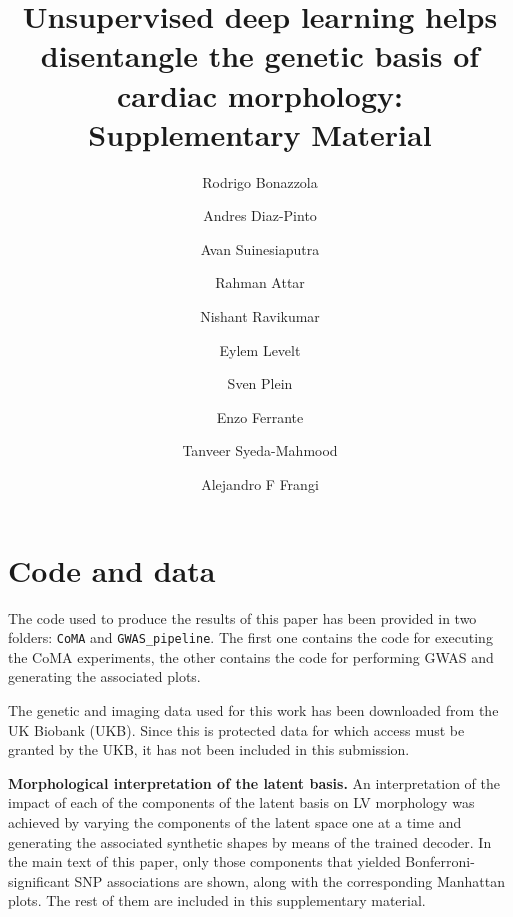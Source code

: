 \documentclass[fleqn,10pt]{wlscirep}
\def\code#1{\texttt{#1}}
\begin{document}
\title{Unsupervised deep learning helps disentangle the genetic basis of cardiac morphology: Supplementary Material}

\author[1,2,*]{Rodrigo Bonazzola}
\author[1,2]{Andres Diaz-Pinto}
\author[1,2]{Avan Suinesiaputra}
\author[1,2]{Rahman Attar}
\author[1,2]{Nishant Ravikumar}
\author[2]{Eylem Levelt}
\author[2]{Sven Plein}
\author[3]{Enzo Ferrante}
\author[4]{Tanveer Syeda-Mahmood}
\author[1,2,5]{Alejandro F Frangi}



\section{Code and data}
The code used to produce the results of this paper has been provided in two folders:  \code{CoMA} and \code{GWAS\_pipeline}. The first one contains the code for executing the CoMA experiments, the other contains the code for performing GWAS and generating the associated plots.

The genetic and imaging data used for this work has been downloaded from the UK Biobank (UKB). Since this is protected data for which access must be granted by the UKB, it has not been included in this submission.

\textbf{Morphological interpretation of the latent basis.} An interpretation of the impact of each of the components of the latent basis on LV morphology was achieved by varying the components of the latent space one at a time and generating the associated synthetic shapes by means of the trained decoder. %
In the main text of this paper, only those components that yielded Bonferroni-significant SNP associations are shown, along with the corresponding Manhattan plots. The rest of them are included in this supplementary material.
\end{document}
